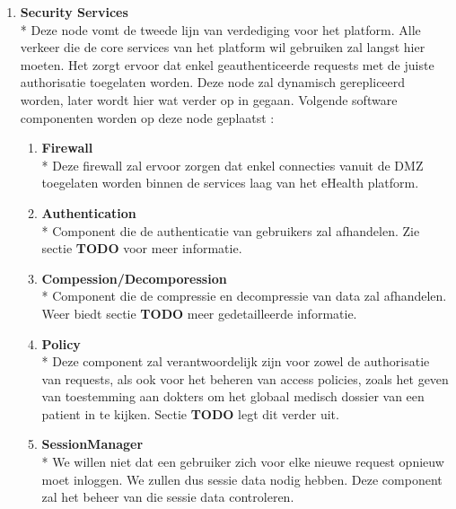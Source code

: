 \documentclass[a4paper,10pt]{article}
\begin{document}
\begin{enumerate}
\item \textbf{Security Services}\\*
Deze node vomt de tweede lijn van verdediging voor het platform. Alle verkeer die de core services van het platform wil gebruiken zal langst hier moeten. Het zorgt ervoor dat enkel geauthenticeerde requests met de juiste authorisatie toegelaten worden. Deze node zal dynamisch gerepliceerd worden, later wordt hier wat verder op in gegaan. Volgende software componenten worden op deze node geplaatst : 
\begin{enumerate}
 \item \textbf{Firewall}\\*
Deze firewall zal ervoor zorgen dat enkel connecties vanuit de DMZ toegelaten worden binnen de services laag van het eHealth platform.
\item \textbf{Authentication}\\*
Component die de authenticatie van gebruikers zal afhandelen. Zie sectie \textbf{TODO} voor meer informatie.
\item \textbf{Compession/Decomporession}\\*
Component die de compressie en decompressie van data zal afhandelen. Weer biedt sectie \textbf{TODO} meer gedetailleerde informatie.
\item \textbf{Policy}\\*
Deze component zal verantwoordelijk zijn voor zowel de authorisatie van requests, als ook voor het beheren van access policies, zoals het geven van toestemming aan dokters om het globaal medisch dossier van een patient in te kijken. Sectie \textbf{TODO} legt dit verder uit.
\item \textbf{SessionManager}\\*
We willen niet dat een gebruiker zich voor elke nieuwe request opnieuw moet inloggen. We zullen dus sessie data nodig hebben. Deze component zal het beheer van die sessie data controleren.
\end{enumerate}


\end{enumerate}
\end{document}
